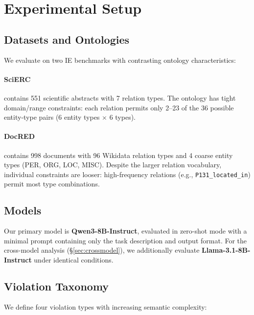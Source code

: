 \documentclass[11pt,a4paper]{article}
\begin{document}
\section{Experimental Setup}
\label{sec:setup}

\subsection{Datasets and Ontologies}

We evaluate on two IE benchmarks with contrasting ontology characteristics:

\paragraph{SciERC} \citep{luan2018scierc} contains 551 scientific abstracts with 7 relation types.
The ontology has tight domain/range constraints: each relation permits only 2--23 of the 36 possible entity-type pairs (6 entity types ${\times}$ 6 types).

\paragraph{DocRED} \citep{yao2019docred} contains 998 documents with 96 Wikidata relation types and 4 coarse entity types (PER, ORG, LOC, MISC).
Despite the larger relation vocabulary, individual constraints are looser: high-frequency relations (e.g., \texttt{P131\_located\_in}) permit most type combinations.

\subsection{Models}

Our primary model is \textbf{Qwen3-8B-Instruct}, evaluated in zero-shot mode with a minimal prompt containing only the task description and output format.
For the cross-model analysis (\S\ref{sec:crossmodel}), we additionally evaluate \textbf{Llama-3.1-8B-Instruct} under identical conditions.

\subsection{Violation Taxonomy}
\label{sec:taxonomy}

We define four violation types with increasing semantic complexity:
\end{document}
